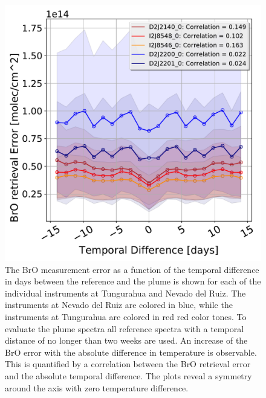 \begin{figure}
	\centering
	\includegraphics[width=0.7\linewidth]{Bilder/DatallInstruments}
	\caption{The BrO measurement error as a function of the temporal difference in days between the reference and the plume is shown for each of the individual instruments at Tungurahua and Nevado del Ruiz. The instruments at Nevado del Ruiz are colored in blue, while the instruments at Tungurahua are colored in red red color tones.  To evaluate the plume spectra all reference spectra with a temporal distance of no longer than two weeks are used. An increase of the BrO error with the absolute difference in temperature is observable. This is quantified by a correlation between the BrO retrieval error and the absolute temporal difference. The plots reveal a symmetry around the axis with zero temperature difference.}
	\label{fig:datallinstruments}
\end{figure}





